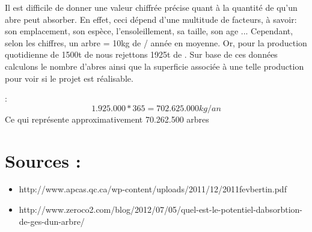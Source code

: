 \documentclass[10pt,a4paper]{article}
\begin{document}
Il est difficile de donner une valeur chiffrée précise quant à la quantité de  qu'un abre peut absorber. En effet, ceci dépend d'une multitude de facteurs, à savoir: son emplacement, son espèce, l'ensoleillement, sa taille, son age ... Cependant, selon les chiffres, un arbre = 10kg de  / année en moyenne.
Or, pour la production quotidienne de 1500t de  nous rejettons 1925t de .
Sur base de ces données calculons le nombre d'abres ainsi que la superficie associée à une telle production pour voir si le projet est réalisable.

 : $$1.925.000 * 365 = 702.625.000kg/an $$ 
Ce qui représente approximativement 70.262.500 arbres



\section{Sources :}

\begin{itemize}
\item http://www.apcas.qc.ca/wp-content/uploads/2011/12/2011fevbertin.pdf
\item http://www.zeroco2.com/blog/2012/07/05/quel-est-le-potentiel-dabsorbtion-de-ges-dun-arbre/
\end{itemize}
\end{document}
